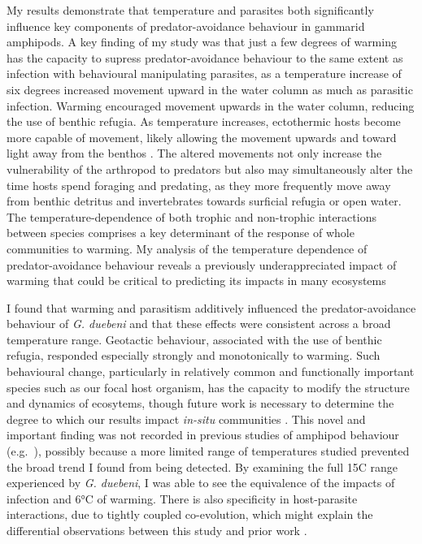 My results demonstrate that temperature and parasites both significantly influence key components of predator-avoidance behaviour in gammarid amphipods. A key finding of my study was that just a few degrees of warming has the capacity to supress predator-avoidance behaviour to the same extent as infection with behavioural manipulating parasites, as a temperature increase of six degrees increased movement upward in the water column as much as parasitic infection. Warming encouraged movement upwards in the water column, reducing the use of benthic refugia. As temperature increases, ectothermic hosts become more capable of movement, likely allowing the movement upwards and toward light away from the benthos \citep{pawar2016, abram2017}. The altered movements not only increase the vulnerability of the arthropod to predators \citep{perrot2012} but also may simultaneously alter the time hosts spend foraging and predating, as they more frequently move away from benthic detritus and invertebrates towards surficial refugia or open water. The temperature-dependence of both trophic \citep{uszko2017} and non-trophic \citep{kordas2017} interactions between species comprises a key determinant of the response of whole communities to warming. My analysis of the temperature dependence of predator-avoidance behaviour reveals a previously underappreciated impact of warming that could be critical to predicting its impacts in many ecosystems

I found that warming and parasitism additively influenced the predator-avoidance behaviour of \emph{G. duebeni} and that these effects were consistent across a broad temperature range. Geotactic behaviour, associated with the use of benthic refugia, responded especially strongly and monotonically to warming. Such behavioural change, particularly in relatively common and functionally important species such as our focal host organism, has the capacity to modify the structure and dynamics of ecosytems, though future work is necessary to determine the degree to which our results impact \emph{in-situ} communities \citep{kefi2015, kefi2016, suraci2016, donohue2017}. This novel and important finding was not recorded in previous studies of amphipod behaviour (e.g.\ \citet{labaude2017}), possibly because a more limited range of temperatures studied prevented the broad trend I found from being detected. By examining the full 15\degree C range experienced by \emph{G. duebeni}, I was able to see the equivalence of the impacts of infection and 6°C of warming. There is also specificity in host-parasite interactions, due to tightly coupled co-evolution, which might explain the differential observations between this study and prior work \citep{omahony2004, westram2011}. 

